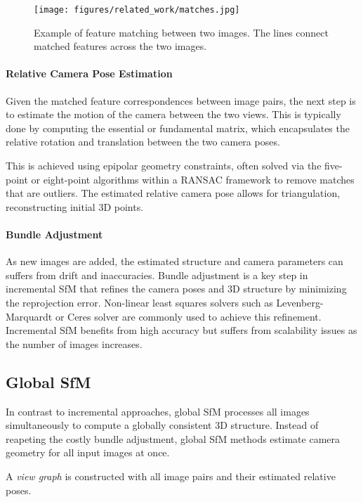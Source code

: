 \begin{figure}[h]
    \centering
    \texttt{[image: figures/related\_work/matches.jpg]}
    \caption[Feature matching example]{Example of feature matching between two images. The lines connect matched features across the two images.}
    \label{fig:incremental_sfm}
\end{figure}


\paragraph{Relative Camera Pose Estimation}
Given the matched feature correspondences between image pairs, the next step is to estimate the motion of the camera between the two views.
This is typically done by computing the essential or fundamental matrix, which encapsulates the relative rotation and translation between the two camera poses.

This is achieved using epipolar geometry constraints, often solved via the five-point or eight-point algorithms within a RANSAC \cite{fischler1981random} framework to remove matches that are outliers.
The estimated relative camera pose allows for triangulation, reconstructing initial 3D points.

\paragraph{Bundle Adjustment}
As new images are added, the estimated structure and camera parameters can suffers from drift and inaccuracies.
Bundle adjustment is a key step in incremental SfM that refines the camera poses and 3D structure by minimizing the reprojection error.
Non-linear least squares solvers such as Levenberg-Marquardt or Ceres solver are commonly used to achieve this refinement. 
Incremental SfM benefits from high accuracy but suffers from scalability issues as the number of images increases.

\subsection{Global SfM}
In contrast to incremental approaches, global SfM processes all images simultaneously to compute a globally consistent 3D structure.
Instead of reapeting the costly bundle adjustment, global SfM methods estimate camera geometry for all input images at once.

A \emph{view graph} is constructed with all image pairs and their estimated relative poses.


